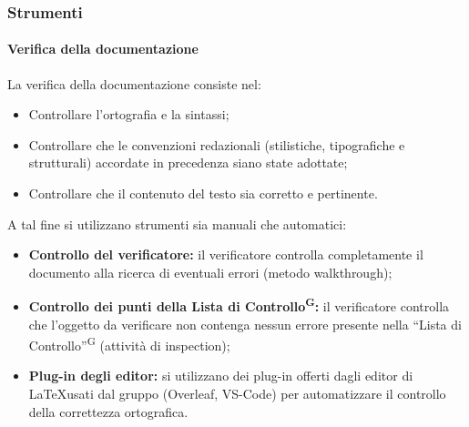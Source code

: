 \subsubsection{Strumenti}
\paragraph{Verifica della documentazione}
La verifica della documentazione consiste nel:
\begin{itemize}
    \item Controllare l'ortografia e la sintassi;
    \item Controllare che le convenzioni redazionali (stilistiche, tipografiche e strutturali) accordate in precedenza siano state adottate;
    \item Controllare che il contenuto del testo sia corretto e pertinente.
\end{itemize}
A tal fine si utilizzano strumenti sia manuali che automatici:
\begin{itemize}
    \item \textbf{Controllo del verificatore:} il verificatore controlla completamente il documento alla ricerca di eventuali errori (metodo walkthrough);
    \item \textbf{Controllo dei punti della Lista di Controllo\textsuperscript{G}:} il verificatore controlla che l'oggetto da verificare non contenga nessun errore presente nella ``Lista di Controllo''\textsuperscript{G} (attività di inspection);
    \item \textbf{Plug-in degli editor:} si utilizzano dei plug-in offerti dagli editor di \LaTeX usati dal gruppo (Overleaf, VS-Code) per automatizzare il controllo della correttezza ortografica.
\end{itemize}

